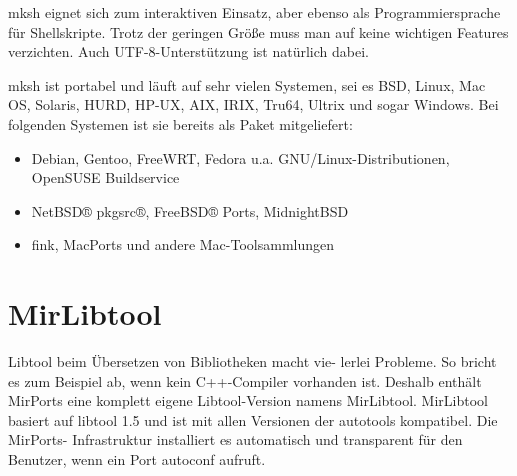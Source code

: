\documentclass[
a4paper,%
notumble%
]{leaflet}
\begin{document}
mksh eignet sich zum interaktiven Einsatz, aber ebenso als Programmiersprache für Shellskripte. Trotz der geringen Größe muss man auf keine wichtigen Features verzichten. Auch UTF-8-Unterstützung ist natürlich dabei.

mksh ist portabel und läuft auf sehr vielen Systemen, sei es BSD, Linux, Mac OS, Solaris, HURD, HP-UX, AIX, IRIX, Tru64, Ultrix und sogar Windows. Bei folgenden Systemen ist sie bereits als Paket mitgeliefert:

\begin{itemize}
\item Debian, Gentoo, FreeWRT, Fedora u.a. GNU/Linux-Distributionen, OpenSUSE Buildservice
\item NetBSD® pkgsrc®, FreeBSD® Ports, MidnightBSD
\item fink, MacPorts und andere Mac-Toolsammlungen
\end{itemize}

\section{MirLibtool}

Libtool beim Übersetzen von Bibliotheken macht vie-
lerlei Probleme. So bricht es zum Beispiel ab, wenn kein C++-Compiler vorhanden ist. Deshalb enthält MirPorts eine komplett eigene Libtool-Version namens MirLibtool.
MirLibtool basiert auf libtool 1.5 und ist mit allen Versionen der autotools kompatibel. Die MirPorts- Infrastruktur installiert es automatisch und transparent für den Benutzer, wenn ein Port autoconf aufruft.
\end{document}
